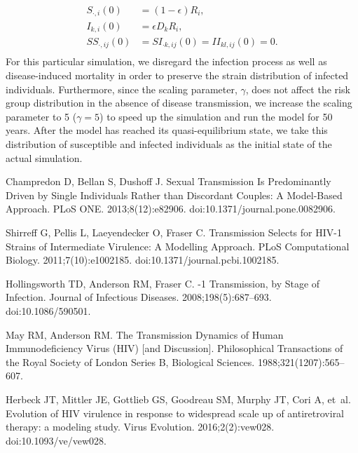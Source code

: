 \documentclass[10pt,letterpaper]{article}
\begin{document}
\begin{equation}
\begin{aligned}
S_{\cdot,i}(0) &= (1 - \epsilon) R_i,\\
I_{k,i}(0) &= \epsilon D_k R_i,\\
SS_{\cdot,ij}(0) &= SI_{\cdot k, ij}(0) = II_{kl,ij} (0) = 0.\\
\end{aligned}
\end{equation}
For this particular simulation, we disregard the infection process as well as disease-induced mortality in order to preserve the strain distribution of infected individuals. Furthermore, since the scaling parameter, $\gamma$, does not affect the risk group distribution in the absence of disease transmission, we increase the scaling parameter to 5 ($\gamma = 5$) to speed up the simulation and run the model for 50 years. After the model has reached its quasi-equilibrium state, we take this distribution of susceptible and infected individuals as the initial state of the actual simulation.

\begin{thebibliography}{1}

Champredon D, Bellan S, Dushoff J.
 Sexual Transmission Is Predominantly Driven by Single
  Individuals Rather than Discordant Couples: A Model-Based Approach.
\newblock PLoS ONE. 2013;8(12):e82906.
\newblock doi:{10.1371/journal.pone.0082906}.

Shirreff G, Pellis L, Laeyendecker O, Fraser C.
\newblock Transmission Selects for {HIV-1} Strains of Intermediate Virulence: A
  Modelling Approach.
\newblock PLoS Computational Biology. 2011;7(10):e1002185.
\newblock doi:{10.1371/journal.pcbi.1002185}.

Hollingsworth TD, Anderson RM, Fraser C.
-1 Transmission, by Stage of Infection.
\newblock Journal of Infectious Diseases. 2008;198(5):687--693.
\newblock doi:{10.1086/590501}.

May RM, Anderson RM.
\newblock The Transmission Dynamics of Human Immunodeficiency Virus (HIV) [and
  Discussion].
\newblock Philosophical Transactions of the Royal Society of London Series B,
  Biological Sciences. 1988;321(1207):565--607.

Herbeck JT, Mittler JE, Gottlieb GS, Goodreau SM, Murphy JT, Cori A, et~al.
\newblock Evolution of {HIV} virulence in response to widespread scale up of
  antiretroviral therapy: a modeling study.
\newblock Virus Evolution. 2016;2(2):vew028.
\newblock doi:{10.1093/ve/vew028}.

\end{thebibliography}
\end{document}
